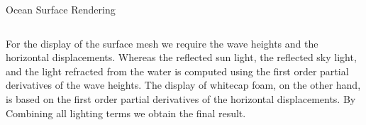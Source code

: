 \documentclass[final,hyperref={pdfpagelabels=true}]{beamer}
\begin{document}
\begin{frame}
\begin{center}
\begin{minipage}{0.99\textwidth}
\begin{block}{Ocean Surface Rendering}
			\begin{columns}[t]
				\begin{column}{0.95\linewidth}
					For the display of the surface mesh we require the wave heights and the horizontal displacements.
					Whereas the reflected sun light, the reflected sky light, and the light refracted from the water 
					is computed using the first order partial derivatives of the wave heights.
					The display of whitecap foam, on the other hand, is based on the first order partial derivatives of the horizontal displacements. By Combining all lighting terms we obtain the final result.
					\begin{figure}
					\centering

\end{figure}
\end{column}
\end{columns}
\end{block}
\end{minipage}
\end{center}
\end{frame}
\end{document}
